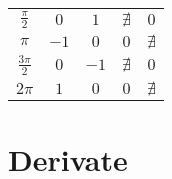 \documentclass[a4paper,10pt]{article}
\theoremstyle{mystyle}
\begin{document}
\begin{center}
\begin{tabular}{c c c c c}
    \( \frac{\pi}{2} \) & \( 0 \) & \( 1 \) & \( \nexists \) & \( 0 \) \\ %
    \( \pi \) & \( -1 \) & \( 0 \) & \( 0 \) & \( \nexists \) \\ %
    \( \frac{3\pi}{2} \) & \( 0 \) & \( -1 \) & \( \nexists \) & \( 0 \) \\ %
    \( 2\pi \) & \( 1 \) & \( 0 \) & \( 0 \) & \( \nexists \) \\ %
    \hline
\end{tabular}
\end{center}



\section{Derivate}
\end{document}
